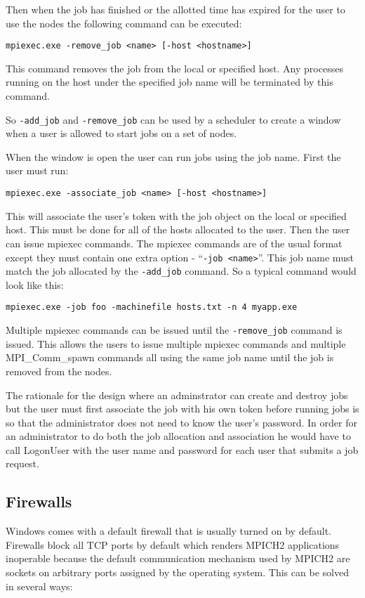 \documentclass[dvipdfm,11pt]{article}
\begin{document}
Then when the job has finished or the allotted time has expired for the user to use the nodes the 
following command can be executed:
\begin{verbatim}
mpiexec.exe -remove_job <name> [-host <hostname>]
\end{verbatim}
This command removes the job from the local or specified host.  Any processes running on the host 
under the specified job name will be terminated by this command.

So \texttt{-add\_job} and \texttt{-remove\_job} can be used by a scheduler to create a window when a user is allowed to
start jobs on a set of nodes.

When the window is open the user can run jobs using the job name.  First the user must run:
\begin{verbatim}
mpiexec.exe -associate_job <name> [-host <hostname>]
\end{verbatim}
This will associate the user's token with the job object on the local or
specified host.  This must be done for all of the hosts allocated to the user.  Then the user can issue
mpiexec commands.  The mpiexec commands are of the usual format except they must contain one extra option -
``\texttt{-job <name>}''.  This job name must match the job allocated by the \texttt{-add\_job} command.  So a typical command
would look like this:
\begin{verbatim}
mpiexec.exe -job foo -machinefile hosts.txt -n 4 myapp.exe
\end{verbatim}
Multiple mpiexec commands can be issued until the \texttt{-remove\_job} command is issued.
This allows the users to issue multiple 
mpiexec commands and multiple MPI\_Comm\_spawn commands all using the same job name until the job is removed
from the nodes.

The rationale for the design where an adminstrator can create and destroy jobs but the user must first associate
the job with his own token before running jobs is so that the administrator does not need to know the user's
password.  In order for an administrator to do both the job allocation and association he would have to call
LogonUser with the user name and password for each user that submits a job request.

\subsection{Firewalls}
Windows comes with a default firewall that is usually turned on by default.
Firewalls block all TCP ports by default which renders MPICH2 applications inoperable
because the default communication mechanism used by MPICH2 are sockets on arbitrary
ports assigned by the operating system.  This can be solved in several ways:
\end{document}
